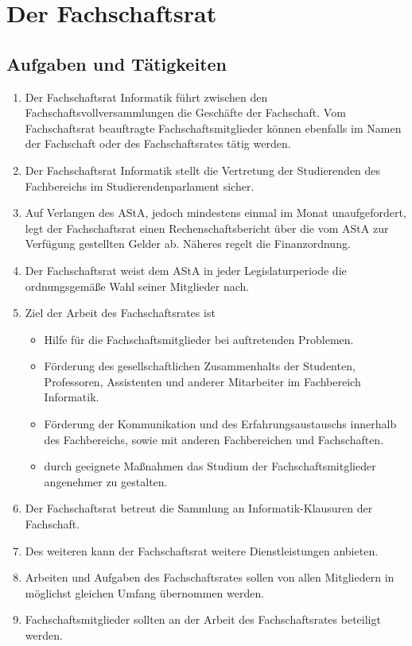 \section{Der Fachschaftsrat}
\subsection{Aufgaben und Tätigkeiten}
\begin{enumerate}
\item Der Fachschaftsrat Informatik führt zwischen den Fachschaftsvollversammlungen die Geschäfte der Fachschaft. Vom Fachschaftsrat beauftragte Fachschaftsmitglieder können ebenfalls im Namen der Fachschaft oder des Fachschaftsrates tätig werden.
\item Der Fachschaftsrat Informatik stellt die Vertretung der Studierenden des Fachbereichs im Studierendenparlament sicher.
\item Auf Verlangen des AStA, jedoch mindestens einmal im Monat unaufgefordert, legt der Fachschaftsrat einen Rechenschaftsbericht über die vom AStA zur Verfügung gestellten Gelder ab. Näheres regelt die Finanzordnung.
\item Der Fachschaftsrat weist dem AStA in jeder Legislaturperiode die ordnungsgemäße Wahl seiner Mitglieder nach.
\item Ziel der Arbeit des Fachschaftsrates ist
\begin{itemize}
\item Hilfe für die Fachschaftsmitglieder bei auftretenden Problemen.
\item Förderung des gesellschaftlichen Zusammenhalts der Studenten, Professoren, Assistenten und anderer Mitarbeiter im Fachbereich Informatik.
\item Förderung der Kommunikation und des Erfahrungsaustauschs innerhalb des Fachbereichs, sowie mit anderen Fachbereichen und Fachschaften.
\item durch geeignete Maßnahmen das Studium der Fachschaftsmitglieder angenehmer zu gestalten.
\end{itemize}
\item Der Fachschaftsrat betreut die Sammlung an Informatik-Klausuren der Fachschaft.
\item Des weiteren kann der Fachschaftsrat weitere Dienstleistungen anbieten.
\item Arbeiten und Aufgaben des Fachschaftsrates sollen von allen Mitgliedern in möglichst gleichen Umfang übernommen werden.
\item Fachschaftsmitglieder sollten an der Arbeit des Fachschaftsrates beteiligt werden.
\end{enumerate}

